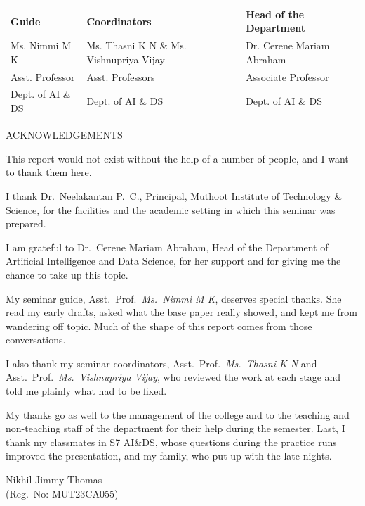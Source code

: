 \documentclass[12pt,a4paper]{report}
\begin{document}
\vspace{3cm}
\noindent
\begin{tabular}{@{}L{0.28\textwidth} L{0.36\textwidth} L{0.28\textwidth}@{}}
\textbf{Guide} & \textbf{Coordinators} & \textbf{Head of the Department} \\[6pt]
Ms. Nimmi M K & Ms. Thasni K N \& Ms. Vishnupriya Vijay & Dr. Cerene Mariam Abraham \\[2pt]
Asst. Professor & Asst. Professors & Associate Professor \\[2pt]
Dept. of AI \& DS & Dept. of AI \& DS & Dept. of AI \& DS \\
\end{tabular}

\newpage
\thispagestyle{plain}
\begin{center}
    {\Large ACKNOWLEDGEMENTS}
\end{center}
\vspace{0.6cm}
\begin{onehalfspace}
This report would not exist without the help of a number of people, and I want to thank them here.

I thank Dr.\ Neelakantan P.\ C., Principal, Muthoot Institute of Technology \& Science, for the facilities and the academic setting in which this seminar was prepared.

I am grateful to Dr.\ Cerene Mariam Abraham, Head of the Department of Artificial Intelligence and Data Science, for her support and for giving me the chance to take up this topic.

My seminar guide, Asst.\ Prof.\ \textit{Ms.\ Nimmi M K}, deserves special thanks. She read my early drafts, asked what the base paper really showed, and kept me from wandering off topic. Much of the shape of this report comes from those conversations.

I also thank my seminar coordinators, Asst.\ Prof.\ \textit{Ms.\ Thasni K N} and Asst.\ Prof.\ \textit{Ms.\ Vishnupriya Vijay}, who reviewed the work at each stage and told me plainly what had to be fixed.

My thanks go as well to the management of the college and to the teaching and non-teaching staff of the department for their help during the semester. Last, I thank my classmates in S7 AI\&DS, whose questions during the practice runs improved the presentation, and my family, who put up with the late nights.
\end{onehalfspace}

\vspace{1.5cm}
\begin{flushright}
Nikhil Jimmy Thomas\\
(Reg.\ No: MUT23CA055)
\end{flushright}
\end{document}
